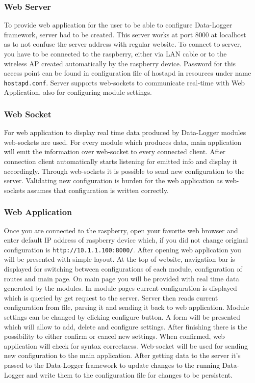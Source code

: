 \subsubsection{Web Server} %
\label{ssub:web_server}
To provide web application for the user to be able to configure Data-Logger framework, server had to be created. This server works at port 8000 at localhost as to not confuse the server address with regular website. To connect to server, you have to be connected to the raspberry, either via LAN cable or to the wireless AP created automatically by the raspberry device. Password for this access point can be found in configuration file of hostapd in resources under name \verb|hostapd.conf|. Server supports web-sockets to communicate real-time with Web Application, also for configuring module settings.
\subsubsection{Web Socket} %
\label{ssub:web_socket}
For web application to display real time data produced by Data-Logger modules web-sockets are used. For every module which produces data, main application will emit the information over web-socket to every connected client. After connection client automatically starts listening for emitted info and display it accordingly. Through web-sockets it is possible to send new configuration to the server. Validating new configuration is burden for the web application as web-sockets assumes that configuration is written correctly.
\subsubsection{Web Application} %
\label{ssub:web_application}
Once you are connected to the raspberry, open your favorite web browser and enter default IP address of raspberry device which, if you did not change original configuration is \verb|http://10.1.1.100:8000/|. After opening web application you will be presented with simple layout. At the top of website, navigation bar is displayed for switching between configurations of each module, configuration of routes and main page. On main page you will be provided with real time data generated by the modules. In module pages current configuration is displayed which is queried by get request to the server. Server then reads current configuration from file, parsing it and sending it back to web application. Module settings can be changed by clicking configure button. A form will be presented which will allow to add, delete and configure settings. After finishing there is the possibility to either confirm or cancel new settings. When confirmed, web application will check for syntax correctness. Web-socket will be used for sending new configuration to the main application. After getting data to the server it's passed to the Data-Logger framework to update changes to the running Data-Logger and write them to the configuration file for changes to be persistent.
